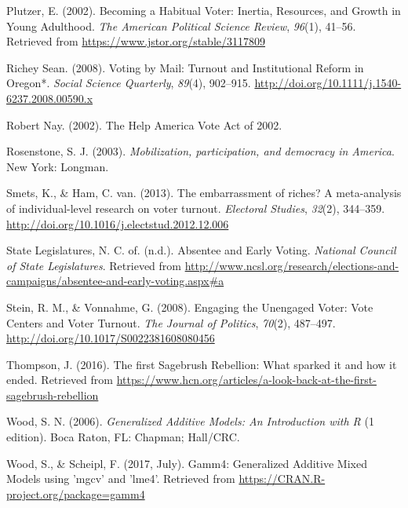 \documentclass[12pt,twoside]{reedthesis}
\begin{document}
  \hypertarget{ref-plutzer_becoming_2002}{}
  Plutzer, E. (2002). Becoming a Habitual Voter: Inertia, Resources, and
  Growth in Young Adulthood. \emph{The American Political Science Review},
  \emph{96}(1), 41--56. Retrieved from
  \url{https://www.jstor.org/stable/3117809}
  
  \hypertarget{ref-richey_sean_voting_2008}{}
  Richey Sean. (2008). Voting by Mail: Turnout and Institutional Reform in
  Oregon*. \emph{Social Science Quarterly}, \emph{89}(4), 902--915.
  \url{http://doi.org/10.1111/j.1540-6237.2008.00590.x}
  
  \hypertarget{ref-robert_nay_help_2002}{}
  Robert Nay. (2002). The Help America Vote Act of 2002.
  
  \hypertarget{ref-rosenstone_mobilization_2003}{}
  Rosenstone, S. J. (2003). \emph{Mobilization, participation, and
  democracy in America}. New York: Longman.
  
  \hypertarget{ref-smets_embarrassment_2013}{}
  Smets, K., \& Ham, C. van. (2013). The embarrassment of riches? A
  meta-analysis of individual-level research on voter turnout.
  \emph{Electoral Studies}, \emph{32}(2), 344--359.
  \url{http://doi.org/10.1016/j.electstud.2012.12.006}
  
  \hypertarget{ref-national_council_of_state_legislatures_absentee_nodate}{}
  State Legislatures, N. C. of. (n.d.). Absentee and Early Voting.
  \emph{National Council of State Legislatures}. Retrieved from
  \url{http://www.ncsl.org/research/elections-and-campaigns/absentee-and-early-voting.aspx\#a}
  
  \hypertarget{ref-stein_engaging_2008}{}
  Stein, R. M., \& Vonnahme, G. (2008). Engaging the Unengaged Voter: Vote
  Centers and Voter Turnout. \emph{The Journal of Politics}, \emph{70}(2),
  487--497. \url{http://doi.org/10.1017/S0022381608080456}
  
  \hypertarget{ref-thompson_first_2016}{}
  Thompson, J. (2016). The first Sagebrush Rebellion: What sparked it and
  how it ended. Retrieved from
  \url{https://www.hcn.org/articles/a-look-back-at-the-first-sagebrush-rebellion}
  
  \hypertarget{ref-wood_generalized_2006}{}
  Wood, S. N. (2006). \emph{Generalized Additive Models: An Introduction
  with R} (1 edition). Boca Raton, FL: Chapman; Hall/CRC.
  
  \hypertarget{ref-wood_gamm4:_2017}{}
  Wood, S., \& Scheipl, F. (2017, July). Gamm4: Generalized Additive Mixed
  Models using 'mgcv' and 'lme4'. Retrieved from
  \url{https://CRAN.R-project.org/package=gamm4}


\end{document}
